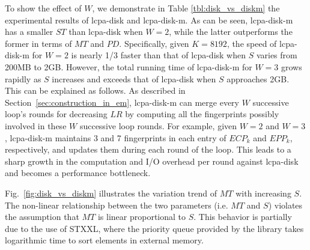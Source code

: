 \documentclass[10pt,journal,letterpaper,compsoc]{IEEEtran}
\begin{document}
\begin{CJK*}{GBK}{song}
To show the effect of $W$, we demonstrate in Table \ref{tbl:disk_vs_diskm} the experimental results of lcpa-disk and lcpa-disk-m. As can be seen, lcpa-disk-m has a smaller $ST$ than lcpa-disk when $W=2$, while the latter outperforms the former in terms of $MT$ and $PD$. Specifically, given $K=8192$, the speed of lcpa-disk-m for $W=2$ is nearly 1/3 faster than that of lcpa-disk when $S$ varies from 200MB to 2GB. However, the total running time of lcpa-disk-m for $W=3$ grows rapidly as $S$ increases and exceeds that of lcpa-disk when $S$ approaches 2GB. This can be explained as follows. As described in Section~\ref{sec:construction_in_em}, lcpa-disk-m can merge every $W$ successive loop's rounds for decreasing $LR$ by computing all the fingerprints possibly involved in these $W$ successive loop rounds. For example, given $W=2$ and $W=3$, lcpa-disk-m maintains 3 and 7 fingerprints in each entry of $ECP_k$ and $EPP_k$, respectively, and updates them during each round of the loop. This leads to a sharp growth in the computation and I/O overhead per round against lcpa-disk and becomes a performance bottleneck.

Fig.~\ref{fig:disk_vs_diskm} illustrates the variation trend of $MT$ with increasing $S$. The non-linear relationship between the two parameters (i.e. $MT$ and $S$) violates the assumption that $MT$ is linear proportional to $S$. This behavior is partially due to the use of STXXL, where the priority queue provided by the library takes logarithmic time to sort elements in external memory.


\end{CJK*}
\end{document}
